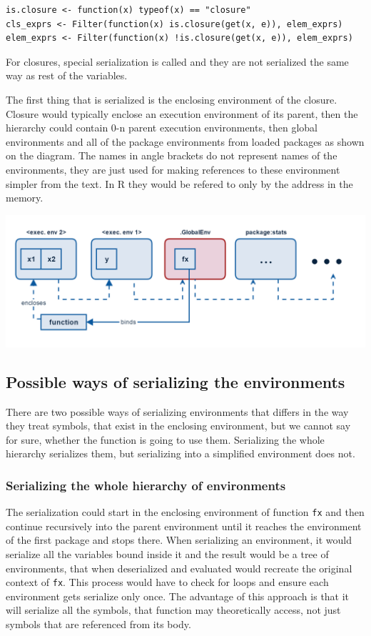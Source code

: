 \documentclass[thesis=B,english]{FITthesis}[2012/10/20]
\begin{document}
\begin{verbatim}
is.closure <- function(x) typeof(x) == "closure"
cls_exprs <- Filter(function(x) is.closure(get(x, e)), elem_exprs)
elem_exprs <- Filter(function(x) !is.closure(get(x, e)), elem_exprs)
\end{verbatim}

For closures, special serialization is called and they are not serialized the same way as rest of the variables. 

The first thing that is serialized is the enclosing environment of the closure. Closure would typically enclose an execution environment of its parent, then the hierarchy could contain 0-n parent execution environments, then global environments and all of the package environments from loaded packages as shown on the diagram. The names in angle brackets do not represent names of the environments, they are just used for making references to these environment simpler from the text. In R they would be refered to only by the address in the memory. 

\includegraphics[width=\textwidth]{img/func-exec.png}

\subsection{Possible ways of serializing the environments}
There are two possible ways of serializing environments that differs in the way they treat symbols, that exist in the enclosing environment, but we cannot say for sure, whether the function is going to use them. Serializing the whole hierarchy serializes them, but serializing into a simplified environment does not.

\subsubsection{Serializing the whole hierarchy of environments}
The serialization could start in the enclosing environment of function \verb|fx| and then continue recursively into the parent environment until it reaches the environment of the first package and stops there. When serializing an environment, it would serialize all the variables bound inside it and the result would be a tree of environments, that when deserialized and evaluated would recreate the original context of \verb|fx|. This process would have to check for loops and ensure each environment gets serialize only once. The advantage of this approach is that it will serialize all the symbols, that function may theoretically access, not just symbols that are referenced from its body.
\end{document}
